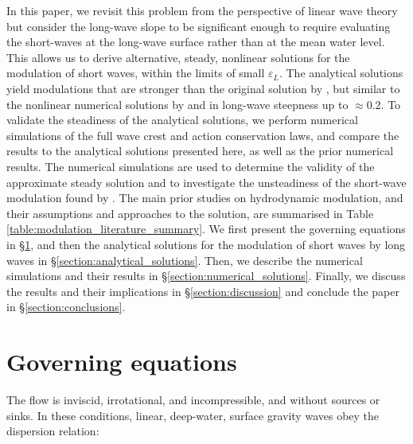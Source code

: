 \documentclass[lineno]{jfm}
\begin{document}
In this paper, we revisit this problem from the perspective of linear wave theory
but consider the long-wave slope to be significant enough to require evaluating
the short-waves at the long-wave surface rather than at the mean water level.
This allows us to derive alternative, steady, nonlinear solutions for the
modulation of short waves, within the limits of small $\varepsilon_L$.
The analytical solutions yield modulations that are stronger than the original
solution by \citet{longuet1960changes}, but similar to the nonlinear numerical
solutions by \citet{longuet1987propagation} and \citet{zhang1990evolution} in
long-wave steepness up to $\approx 0.2$.
To validate the steadiness of the analytical solutions, we perform numerical
simulations of the full wave crest and action conservation laws, and compare
the results to the analytical solutions presented here, as well as the prior
numerical results.
The numerical simulations are used to determine the validity of the approximate
steady solution and to investigate the unsteadiness of the short-wave modulation
found by \citet{peureux2021unsteady}.
The main prior studies on hydrodynamic modulation, and their assumptions and
approaches to the solution, are summarised in Table
\ref{table:modulation_literature_summary}.
We first present the governing equations in \S\ref{section:governing_equations},
and then the analytical solutions for the modulation of short waves by long waves
in \S\ref{section:analytical_solutions}.
Then, we describe the numerical simulations and their results in
\S\ref{section:numerical_solutions}.
Finally, we discuss the results and their implications in
\S\ref{section:discussion} and conclude the paper in \S\ref{section:conclusions}.

\section{Governing equations}
\label{section:governing_equations}

The flow is inviscid, irrotational, and incompressible, and without sources or
sinks.
In these conditions, linear, deep-water, surface gravity waves obey the
dispersion relation:
\end{document}
